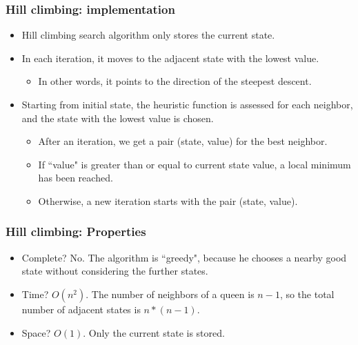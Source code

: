 \documentclass{beamer}
\begin{document}
    \begin{frame}
    \frametitle{Hill climbing: implementation}
        \begin{itemize}
            \item Hill climbing search algorithm only stores the current state.
            \pause
            \item In each iteration, it moves to the adjacent state with the lowest value.
            \pause
            \begin{itemize}
                \item In other words, it points to the direction of the steepest descent.
            \end{itemize}
            \pause
            \item Starting from initial state, the heuristic function is assessed for each neighbor, and the state with the lowest value is chosen.
            \pause
            \begin{itemize}
                \item After an iteration, we get a pair (state, value) for the best neighbor.
                \pause
                \item If ``value" is greater than or equal to current state value, a local minimum has been reached.
                \pause
                \item Otherwise, a new iteration starts with the pair (state, value).
            \end{itemize} 
        \end{itemize}
    \end{frame}

    \begin{frame}
    \frametitle{Hill climbing: Properties}
     \begin{itemize}
         \item Complete? \pause No.
         \pause The algorithm is ``greedy", because he chooses a nearby good state without considering the further states.
         \pause
         \item Time? \pause 
         \begin{math}O(n^2).\end{math}
         \pause The number of neighbors of a queen is \begin{math}n-1\end{math}, so the total number of adjacent states is \begin{math}n * (n-1)\end{math}.
         \pause
         \item Space? \pause
         \begin{math}O(1).\end{math}
         \pause Only the current state is stored.
     \end{itemize}   
    \end{frame}
\end{document}
